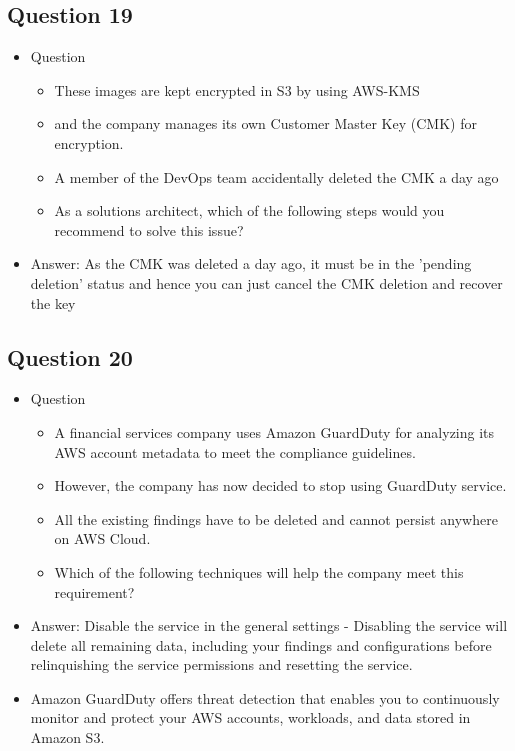 \documentclass[]{scrartcl}
\begin{document}
\subsection{Question 19}
\begin{itemize}
	\item Question
	\begin{itemize}
		\item These images are kept encrypted in S3 by using AWS-KMS 
		\item and the company manages its own Customer Master Key (CMK) for encryption. 
		\item A member of the DevOps team accidentally deleted the CMK a day ago
		\item As a solutions architect, which of the following steps would you recommend to solve this issue?
	\end{itemize}
	\item Answer: As the CMK was deleted a day ago, it must be in the 'pending deletion' status and hence you can just cancel the CMK deletion and recover the key
\end{itemize}

\subsection{Question 20}
\begin{itemize}
	\item Question
	\begin{itemize}
		\item A financial services company uses Amazon GuardDuty for analyzing its AWS account metadata to meet the compliance guidelines. 
		\item However, the company has now decided to stop using GuardDuty service. 
		\item All the existing findings have to be deleted and cannot persist anywhere on AWS Cloud.
		\item Which of the following techniques will help the company meet this requirement?
	\end{itemize}
	\item Answer: Disable the service in the general settings - Disabling the service will delete all remaining data, including your findings and configurations before relinquishing the service permissions and resetting the service. 
	\item Amazon GuardDuty offers threat detection that enables you to continuously monitor and protect your AWS accounts, workloads, and data stored in Amazon S3.
\end{itemize}
\end{document}
